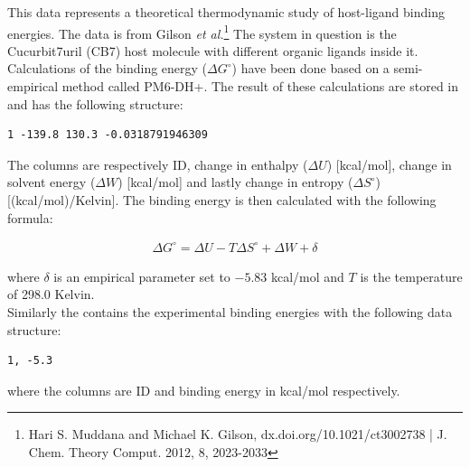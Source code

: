 \documentclass{article}
\begin{document}
This data represents a theoretical thermodynamic study of host-ligand binding energies.
The data is from Gilson {\em et al.}\footnote{Hari S. Muddana and Michael K. Gilson, dx.doi.org/10.1021/ct3002738 | J. Chem. Theory Comput. 2012, 8, 2023-2033}
The system in question is the Cucurbit7uril (CB7) host molecule with different organic ligands inside it.
Calculations of the binding energy ($\Delta G^\circ$) have been done based on a semi-empirical method called PM6-DH+.
The result of these calculations are stored in  and has the following structure:

\begin{lstlisting}
1 -139.8 130.3 -0.0318791946309
\end{lstlisting}

The columns are respectively ID, change in enthalpy ($\Delta U$) [kcal/mol], change in solvent energy ($\Delta W$) [kcal/mol] and lastly change in entropy ($\Delta S^\circ$) [(kcal/mol)/Kelvin].
The binding energy is then calculated with the following formula:

\begin{align}
    \Delta G^\circ = \Delta U - T \Delta S^\circ + \Delta W + \delta
\end{align}

where $\delta$ is an empirical parameter set to $-5.83$ kcal/mol and $T$ is the temperature of 298.0 Kelvin.\\

Similarly the  contains the experimental binding energies with the following data structure:

\begin{lstlisting}
1, -5.3
\end{lstlisting}

where the columns are ID and binding energy in kcal/mol respectively.
\end{document}
